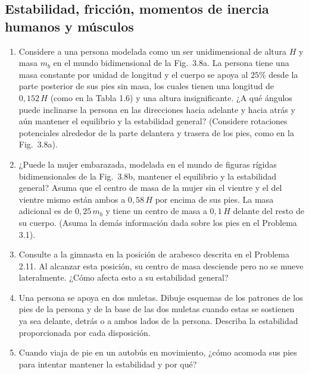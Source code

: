 \documentclass[12pt]{book}
\begin{document}
\subsection*{Estabilidad, fricción, momentos de inercia humanos y músculos}

\begin{enumerate}
\item[3.1] Considere a una persona modelada como un ser unidimensional de altura $H$ y masa $m_b$ en el mundo bidimensional de la Fig.~3.8a. La persona tiene una masa constante por unidad de longitud y el cuerpo se apoya al $25\%$ desde la parte posterior de sus pies sin masa, los cuales tienen una longitud de $0{,}152\,H$ (como en la Tabla 1.6) y una altura insignificante. ¿A qué ángulos puede inclinarse la persona en las direcciones hacia adelante y hacia atrás y aún mantener el equilibrio y la estabilidad general? (Considere rotaciones potenciales alrededor de la parte delantera y trasera de los pies, como en la Fig.~3.8a).

\item[3.2] ¿Puede la mujer embarazada, modelada en el mundo de figuras rígidas bidimensionales de la Fig.~3.8b, mantener el equilibrio y la estabilidad general? Asuma que el centro de masa de la mujer sin el vientre y el del vientre mismo están ambos a $0{,}58\,H$ por encima de sus pies. La masa adicional es de $0{,}25\,m_b$ y tiene un centro de masa a $0{,}1\,H$ delante del resto de su cuerpo. (Asuma la demás información dada sobre los pies en el Problema 3.1).

\item[3.3] Consulte a la gimnasta en la posición de arabesco descrita en el Problema 2.11. Al alcanzar esta posición, su centro de masa desciende pero no se mueve lateralmente. ¿Cómo afecta esto a su estabilidad general?

\item[3.4] Una persona se apoya en dos muletas. Dibuje esquemas de los patrones de los pies de la persona y de la base de las dos muletas cuando estas se sostienen ya sea delante, detrás o a ambos lados de la persona. Describa la estabilidad proporcionada por cada disposición.

\item[3.5] Cuando viaja de pie en un autobús en movimiento, ¿cómo acomoda sus pies para intentar mantener la estabilidad y por qué?


\end{enumerate}
\end{document}
